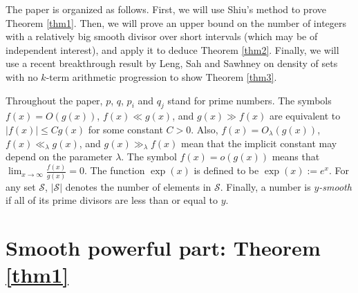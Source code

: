 \documentclass[12pt]{article}
\begin{document}
\bigskip

The paper is organized as follows. First, we will use Shiu's method \cite{S:1980} to prove Theorem \ref{thm1}. Then, we will prove an upper bound on the number of integers with a relatively big smooth divisor over short intervals (which may be of independent interest), and apply it to deduce Theorem \ref{thm2}. Finally, we will use a recent breakthrough result by Leng, Sah and Sawhney \cite{LSS:2024} on density of sets with no $k$-term arithmetic progression to show Theorem \ref{thm3}.

\bigskip

Throughout the paper, $p$, $q$, $p_i$ and $q_j$ stand for prime numbers. The symbols $f(x) = O(g(x))$, $f(x) \ll g(x)$, and $g(x) \gg f(x)$ are equivalent to $|f(x)| \leq C g(x)$ for some constant $C > 0$. Also, $f(x) = O_{\lambda} (g(x))$, $f(x) \ll_{\lambda} g(x)$, and $g(x) \gg_\lambda f(x)$ mean that the implicit constant may depend on the parameter $\lambda$. The symbol $f(x) = o(g(x))$ means that $\lim_{x \rightarrow \infty} \frac{f(x)}{g(x)} = 0$. The function $\exp(x)$ is defined to be $\exp(x) := e^{x}$. For any set $\mathcal{S}$, $| \mathcal{S}|$ denotes the number of elements in $\mathcal{S}$. Finally, a number is {\it $y$-smooth} if all of its prime divisors are less than or equal to $y$.

\section{Smooth powerful part: Theorem \ref{thm1}}
\end{document}
